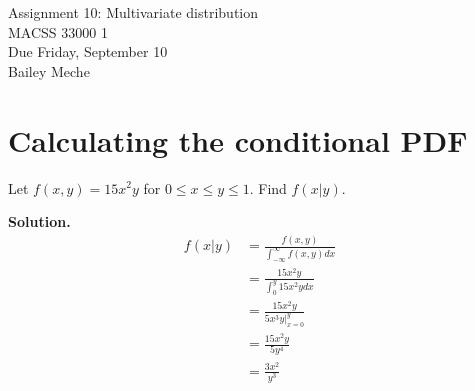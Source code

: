 \documentclass[12pt]{article}
\begin{document}
	\begin{center}
		Assignment 10: Multivariate distribution\\
        MACSS 33000 1 \\
		Due Friday, September 10 \\
      Bailey Meche
	\end{center}

\section{Calculating the conditional PDF}
Let $f(x,y)=15x^2y$ for $0\leq x\leq y\leq 1$. Find $f(x|y)$.

\textbf{Solution.}
\begin{align*}
    f(x|y) &= \frac{f(x,y)}{\int_{-\infty}^\infty f(x,y)dx}
    \\ &= \frac{15x^2y}{\int_0^y 15x^2y dx}
    \\ &= \frac{15x^2y}{5x^3y \bigg|_{x=0}^y}
    \\ &= \frac{15x^2y}{5y^4}
    \\ &= \frac{3x^2}{y^3}
\end{align*}
\end{document}
